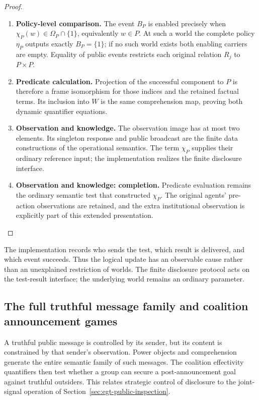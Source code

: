 \documentclass[11pt,a4paper]{article}
\numberwithin{equation}{section}
\theoremstyle{definition}
\theoremstyle{remark}
\theoremstyle{plain}
\begin{document}
\begin{proof}
\leavevmode
\begin{enumerate}[label=\textup{(\arabic*)},leftmargin=*,itemsep=4pt,topsep=3pt]
  \item \textbf{Policy-level comparison.} The event $B_P$ is enabled precisely when
$\chi_P(w)\in\Omega_P\cap\{1\}$, equivalently $w\in P$. At such a
world the complete policy $\eta_P$ outputs exactly $B_P=\{1\}$; if no
such world exists both enabling carriers are empty. Equality of public
events restricts each original relation $R_j$ to $P\times P$.
  \item \textbf{Predicate calculation.} Projection
of the successful component to $P$ is therefore a frame isomorphism for
those indices and the retained factual terms. Its inclusion into $W$ is
the same comprehension map, proving both dynamic quantifier equations.
  \item \textbf{Observation and knowledge.} The observation image has at most two elements. Its singleton response and
public broadcast are the finite data constructions of the operational
semantics. The term $\chi_P$ supplies their ordinary reference input; the
implementation realizes the finite disclosure interface.
  \item \textbf{Observation and knowledge: completion.} Predicate
evaluation remains the ordinary semantic test that constructed $\chi_P$. The original agents' pre-action observations are retained, and the extra
institutional observation is explicitly part of this extended presentation.
\end{enumerate}
\end{proof}


The implementation records who sends the test, which result is
delivered, and which event succeeds. Thus the logical update has an
observable cause rather than an unexplained restriction of worlds.
The finite disclosure protocol acts on the test-result interface; the
underlying world remains an ordinary parameter.

\subsection{The full truthful message family and coalition announcement games}
\label{sec:egt-coalition-announcements}

A truthful public message is controlled by its sender, but its
content is constrained by that sender's observation. Power objects and
comprehension generate the entire semantic family of such messages.
The coalition effectivity quantifiers then test whether a group can
secure a post-announcement goal against truthful outsiders. This
relates strategic control of disclosure to the joint-signal operation
of Section~\ref{sec:egt-public-inspection}.
\end{document}
